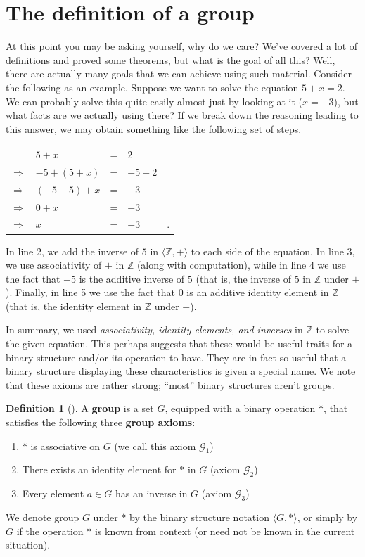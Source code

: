 \documentclass[10pt,]{book}
\newcommand{\terminology}[1]{\textbf{#1}}
\theoremstyle{plain}
\theoremstyle{definition}
\newtheorem{definition}[theorem]{Definition}
\theoremstyle{definition}
\theoremstyle{definition}
\theoremstyle{definition}
\numberwithin{equation}{section}
\def\Z{\mathbb{Z}}
\def\G{\mathcal{G}}
\begin{document}
\section[{The definition of a group}]{The definition of a group}\label{section-5}
At this point you may be asking yourself, why do we care? We've covered a lot of definitions and proved some theorems, but what is the goal of all this? Well, there are actually many goals that we can achieve using such material. Consider the following as an example. Suppose we want to solve the equation \(5+x=2\). We can probably solve this quite easily almost just by looking at it (\(x=-3\)), but what facts are we actually using there? If we break down the reasoning leading to this answer, we may obtain something like the following set of steps.%
\begin{tabular}{lllll}
&\(5+x\)&=&\(2\)&\tabularnewline[0pt]
\(\Rightarrow\)&\(-5+(5+x)\)&=&\(-5+2\)&\tabularnewline[0pt]
\(\Rightarrow\)&\((-5+5)+x\)&=&\(-3\)&\tabularnewline[0pt]
\(\Rightarrow\)&\(0+x\)&=&\(-3\)&\tabularnewline[0pt]
\(\Rightarrow\)&\(x\)&=&\(-3\)&.
\end{tabular}
In line 2, we add the inverse of \(5\) in \(\langle \Z, +\rangle\) to each side of the equation. In line 3, we use associativity of \(+\) in \(\Z\) (along with computation), while in line 4 we use the fact that \(-5\) is the additive inverse of \(5\) (that is, the inverse of \(5\) in \(\Z\) under \(+\)). Finally, in line 5 we use the fact that 0 is an additive identity element in \(\Z\) (that is, the identity element in \(\Z\) under \(+\)).%
\par
In summary, we used \emph{associativity, identity elements, and inverses} in \(\Z\) to solve the given equation. This perhaps suggests that these would be useful traits for a binary structure and/or its operation to have. They are in fact so useful that a binary structure displaying these characteristics is given a special name. We note that these axioms are rather strong; ``most'' binary structures aren't groups.%
\begin{definition}[{}]\label{definition-19}
A \terminology{group} is a set \(G\), equipped with a binary operation \(*\), that satisfies the following three \terminology{group axioms}: \leavevmode%
\begin{enumerate}[label=\Roman*]
\item\hypertarget{li-74}{}\(*\) is associative on \(G\) (we call this axiom \(\G_1\))%
\item\hypertarget{li-75}{}There exists an identity element for \(*\) in \(G\) (axiom \(\G_2\))%
\item\hypertarget{li-76}{}Every element \(a\in G\) has an inverse in \(G\) (axiom \(\G_3\))%
\end{enumerate}
%
\par
We denote group \(G\) under \(*\) by the binary structure notation \(\langle G,*\rangle\), or simply by \(G\) if the operation \(*\) is known from context (or need not be known in the current situation).%
\end{definition}
\end{document}
